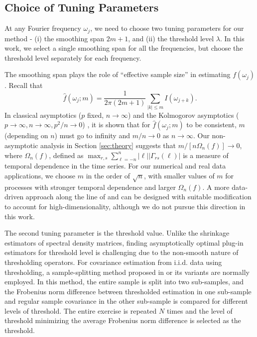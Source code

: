  
\subsection{Choice of Tuning Parameters}\label{sec:tuning-parameter}
At any Fourier frequency $\omega_j$, we need to choose two tuning parameters for our method - (i) the smoothing span $2m+1$, and (ii) the threshold level $\lambda$. In this work, we select a single smoothing span for all the frequencies, but choose the threshold level separately for each frequency.

The smoothing span plays the role of ``effective sample size'' in estimating $f(\omega_j)$. Recall that 
\begin{equation}
    \hat{f}(\omega_j; m) = \frac{1}{2\pi (2m+1)} \sum_{|k|\le m} I(\omega_{j+k}). \nonumber
\end{equation}
In classical asymptotics ($p$ fixed, $n \rightarrow \infty$) and the Kolmogorov asymptotics ($p \rightarrow \infty, n \rightarrow \infty, p^2/n \rightarrow 0$) \citep{brockwell2013time, bohm2009shrinkage}, it is shown that for $\hat{f}(\omega_j; m)$ to be consistent, $m$  (depending on $n$) must go to infinity and $m/n \rightarrow 0$ as $n\rightarrow \infty$. Our non-asymptotic analysis in Section \ref{sec:theory} suggests that $m/[n\Omega_n(f)]  \rightarrow 0$, where $\Omega_n(f)$, defined as $\max_{r,s} \sum_{\ell=-n}^n |\ell| |\Gamma_{rs}(\ell)|$ is a measure of temporal dependence in the time series. For our numerical and real data applications, we choose $m$ in the order of  $\sqrt{n}$, with smaller values of $m$ for processes with stronger temporal dependence and larger $\Omega_n(f)$. A more data-driven approach along the line of \cite{ombao2001smoothing} and \citet{fiecas2014datadriven} can be designed with suitable modification to account for high-dimensionality, although we do not pursue this direction in this work.




The second tuning parameter is the threshold value. Unlike the shrinkage estimators of spectral density matrices, finding  asymptotically optimal plug-in estimators for threshold level is challenging due to the non-smooth nature of thresholding operators. For covariance estimation from  i.i.d. data using thresholding, a sample-splitting method proposed in \citet{bickel2008covariance} or its variants are normally employed. In this method, the entire sample is split into two sub-samples, and the Frobenius norm difference between thresholded estimation in one sub-sample and regular sample covariance in the other sub-sample is compared for different levels of threshold. The entire exercise is repeated $N$ times and the level of threshold minimizing the average Frobenius norm difference is selected as the threshold.

